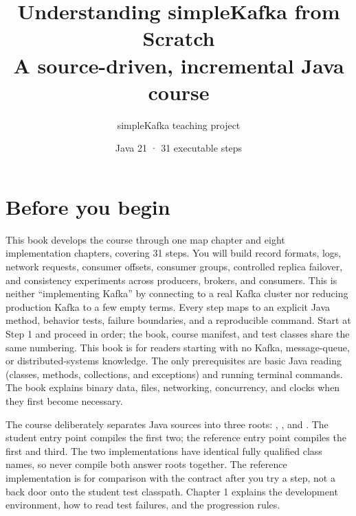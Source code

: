 \title{Understanding simpleKafka from Scratch\\\large A source-driven, incremental Java course}
\author{simpleKafka teaching project}
\date{Java 21 · 31 executable steps}
\hypersetup{pageanchor=false}
\maketitle
\hypersetup{pageanchor=true}
\chapter*{Before you begin}
This book develops the course through one map chapter and eight implementation chapters, covering 31 steps. You will build record formats, logs, network requests, consumer offsets, consumer groups, controlled replica failover, and consistency experiments across producers, brokers, and consumers. This is neither “implementing Kafka” by connecting to a real Kafka cluster nor reducing production Kafka to a few empty terms. Every step maps to an explicit Java method, behavior tests, failure boundaries, and a reproducible command. Start at Step 1 and proceed in order; the book, course manifest, and test classes share the same numbering.
This book is for readers starting with no Kafka, message-queue, or distributed-systems knowledge. The only prerequisites are basic Java reading (classes, methods, collections, and exceptions) and running terminal commands. The book explains binary data, files, networking, concurrency, and clocks when they first become necessary.

The course deliberately separates Java sources into three roots: , , and . The student entry point compiles the first two; the reference entry point compiles the first and third. The two implementations have identical fully qualified class names, so never compile both answer roots together. The reference implementation is for comparison with the contract after you try a step, not a back door onto the student test classpath. Chapter 1 explains the development environment, how to read test failures, and the progression rules.
\tableofcontents

